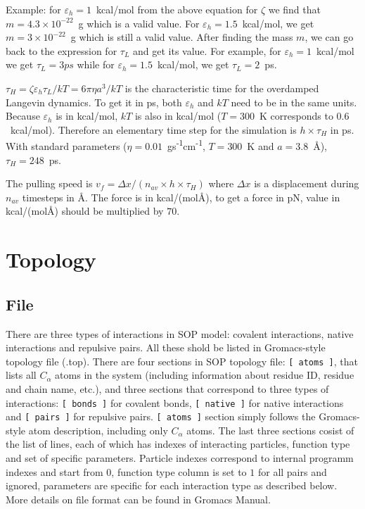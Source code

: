 \documentclass[a4paper]{article}
\begin{document}
Example: for $\varepsilon_h = 1$~kcal/mol from the above equation for $\zeta$ we find that $m = 4.3\times10^{-22}$~g which is a valid value. For $\varepsilon_h = 1.5$~kcal/mol, we get $m = 3\times10^{-22}$~g which is still a valid value. After finding the mass $m$, we can go back to the expression for $\tau_L$ and get its value. For example, for $\varepsilon_h=1$~kcal/mol we get $\tau_L = 3ps$ while for $\varepsilon_h=1.5$~kcal/mol, we get $\tau_L = 2$~ps.

$\tau_H = \zeta\varepsilon_h\tau_L/kT = 6\pi\eta a^3 / kT$ is the characteristic time for the overdamped Langevin dynamics. To get it in ps, both $\varepsilon_h$ and $kT$ need to be in the same units. Because $\varepsilon_h$ is in kcal/mol, $kT$ is also in kcal/mol ($T = 300$~K corresponds to $0.6$~kcal/mol). Therefore an elementary time step for the simulation is $h\times\tau_H$ in ps. With standard parameters ($\eta=0.01$~gs\textsuperscript{-1}cm\textsuperscript{-1}, $T = 300$~K and $a = 3.8$~\AA), $\tau_H = 248$~ps.

The pulling speed is $v_f = \Delta x/(n_{av}\times h\times\tau_H)$ where $\Delta x$ is a displacement during $n_{av}$ timesteps in \AA. The force is in kcal/(mol\AA), to get a force in pN, value in kcal/(mol\AA) should be multiplied by $70$.

\section{Topology}
\subsection{File}
\label{sec:topology.file}
There are three types of interactions in SOP model: covalent interactions, native interactions and repulsive pairs. All these shold be listed in Gromacs-style topology file (.top). There are four sections in SOP topology file: \texttt{[ atoms ]}, that lists all $C_{\alpha}$ atoms in the system (including information about residue ID, residue and chain name, etc.), and three sections that correspond to three types of interactions: \texttt{[ bonds ]} for covalent bonds, \texttt{[ native ]} for native interactions and \texttt{[ pairs ]} for repulsive pairs. \texttt{[ atoms ]} section simply follows the Gromacs-style atom description, including only $C_{\alpha}$ atoms. The last three sections cosist of the list of lines, each of which has indexes of interacting particles, function type and set of specific parameters. Particle indexes correspond to internal programm indexes and start from $0$, function type column is set to $1$ for all pairs and ignored, parameters are specific for each interaction type as 
described below. More details on file format can be found in Gromacs Manual.
\end{document}
